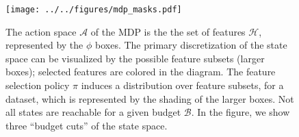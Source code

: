 \begin{figure}[ht]
\centering
\texttt{[image: ../../figures/mdp\_masks.pdf]}
\caption[
Visualizing the discretization of the state space by the possible feature subsets.]{
The action space $\mathcal{A}$ of the MDP is the the set of features $\mathcal{H}$, represented by the $\phi$ boxes.
The primary discretization of the state space can be visualized by the possible feature subsets (larger boxes); selected features are colored in the diagram.
The feature selection policy $\pi$ induces a distribution over feature subsets, for a dataset, which is represented by the shading of the larger boxes.
Not all states are reachable for a given budget $\mathcal{B}$.
In the figure, we show three ``budget cuts'' of the state space.
\label{fig:mdp_masks}
}
\end{figure}
